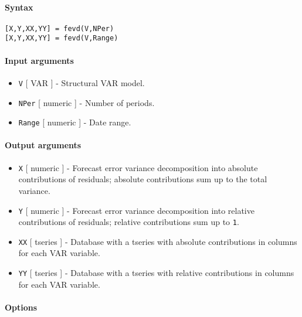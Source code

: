


	\paragraph{Syntax}

\begin{verbatim}
[X,Y,XX,YY] = fevd(V,NPer)
[X,Y,XX,YY] = fevd(V,Range)
\end{verbatim}

\paragraph{Input arguments}

\begin{itemize}
\item
  \texttt{V} {[} VAR {]} - Structural VAR model.
\item
  \texttt{NPer} {[} numeric {]} - Number of periods.
\item
  \texttt{Range} {[} numeric {]} - Date range.
\end{itemize}

\paragraph{Output arguments}

\begin{itemize}
\item
  \texttt{X} {[} numeric {]} - Forecast error variance decomposition
  into absolute contributions of residuals; absolute contributions sum
  up to the total variance.
\item
  \texttt{Y} {[} numeric {]} - Forecast error variance decomposition
  into relative contributions of residuals; relative contributions sum
  up to \texttt{1}.
\item
  \texttt{XX} {[} tseries {]} - Database with a tseries with absolute
  contributions in columns for each VAR variable.
\item
  \texttt{YY} {[} tseries {]} - Database with a tseries with relative
  contributions in columns for each VAR variable.
\end{itemize}

\paragraph{Options}

